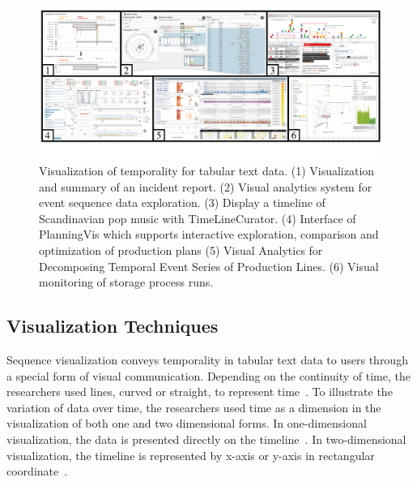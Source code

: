 \documentclass[a4paper,fleqn]{cas-dc}
\begin{document}
\begin{figure}
	\centering
	\includegraphics[width=\textwidth]{Images/tabular text data.pdf}
	\vspace{-4em}
	\caption{Visualization of temporality for tabular text data. (1) Visualization and summary of an incident report. (2) Visual analytics system for event sequence data exploration. (3) Display a timeline of Scandinavian pop music with TimeLineCurator. (4) Interface of PlanningVis which supports interactive exploration, comparison and optimization of production plans (5) Visual Analytics for Decomposing Temporal Event Series of Production Lines. (6) Visual monitoring of storage process runs.}
	\label{fig:tabulartextdata}
	\vspace{-1.5em}
\end{figure}

\subsection{Visualization Techniques}
Sequence visualization conveys temporality in tabular text data to users through a special form of visual communication. 
Depending on the continuity of time, the researchers used lines, curved or straight, to represent time~\cite{bach2015time}.
To illustrate the variation of data over time, the researchers used time as a dimension in the visualization of both one and two dimensional forms.
In one-dimensional visualization, the data is presented directly on the timeline~\cite{chen2017sequence,fulda2015timelinecurator,Gove}. In two-dimensional visualization, the timeline is represented by x-axis or y-axis in rectangular coordinate~\cite{Friedl2021,herr2018visual,sun2019planningvis}.
\end{document}
